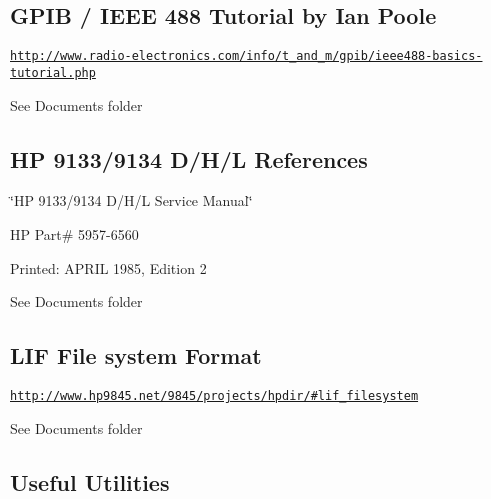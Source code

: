 \subsection*{G\+P\+IB / I\+E\+EE 488 Tutorial by Ian Poole}


\begin{DoxyItemize}
\item \href{http://www.radio-electronics.com/info/t_and_m/gpib/ieee488-basics-tutorial.php}{\tt http\+://www.\+radio-\/electronics.\+com/info/t\+\_\+and\+\_\+m/gpib/ieee488-\/basics-\/tutorial.\+php}
\end{DoxyItemize}

See Documents folder



 \subsection*{HP 9133/9134 D/\+H/L References}


\begin{DoxyItemize}
\item \char`\"{}\+H\+P 9133/9134 D/\+H/\+L Service Manual\char`\"{}
\item HP Part\# 5957-\/6560
\item Printed\+: A\+P\+R\+IL 1985, Edition 2
\item See Documents folder 


\end{DoxyItemize}

\subsection*{L\+IF File system Format}


\begin{DoxyItemize}
\item \href{http://www.hp9845.net/9845/projects/hpdir/#lif_filesystem}{\tt http\+://www.\+hp9845.\+net/9845/projects/hpdir/\#lif\+\_\+filesystem}
\item See Documents folder 


\end{DoxyItemize}

\subsection*{Useful Utilities}


